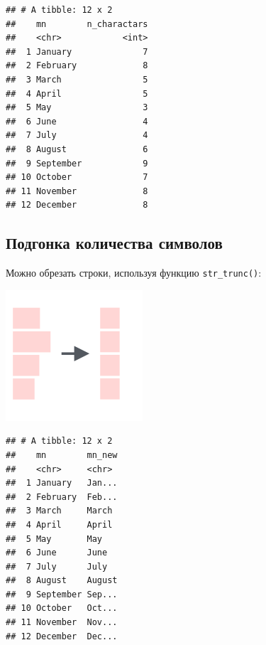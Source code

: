 \documentclass[
]{book}
\newenvironment{Shaded}{\begin{snugshade}}{\end{snugshade}}
\newcommand{\DataTypeTok}[1]{\textcolor[rgb]{0.13,0.29,0.53}{#1}}
\newcommand{\DecValTok}[1]{\textcolor[rgb]{0.00,0.00,0.81}{#1}}
\newcommand{\KeywordTok}[1]{\textcolor[rgb]{0.13,0.29,0.53}{\textbf{#1}}}
\newcommand{\NormalTok}[1]{#1}
\newcommand{\OperatorTok}[1]{\textcolor[rgb]{0.81,0.36,0.00}{\textbf{#1}}}
\newcommand{\StringTok}[1]{\textcolor[rgb]{0.31,0.60,0.02}{#1}}
\begin{document}
\begin{verbatim}
## # A tibble: 12 x 2
##    mn        n_charactars
##    <chr>            <int>
##  1 January              7
##  2 February             8
##  3 March                5
##  4 April                5
##  5 May                  3
##  6 June                 4
##  7 July                 4
##  8 August               6
##  9 September            9
## 10 October              7
## 11 November             8
## 12 December             8
\end{verbatim}

\hypertarget{ux43fux43eux434ux433ux43eux43dux43aux430-ux43aux43eux43bux438ux447ux435ux441ux442ux432ux430-ux441ux438ux43cux432ux43eux43bux43eux432}{%
\subsection{Подгонка количества символов}\label{ux43fux43eux434ux433ux43eux43dux43aux430-ux43aux43eux43bux438ux447ux435ux441ux442ux432ux430-ux441ux438ux43cux432ux43eux43bux43eux432}}

Можно обрезать строки, используя функцию \texttt{str\_trunc()}:

\includegraphics{images/5.02_str_trunc.png}

\begin{Shaded}
\end{Shaded}

\begin{verbatim}
## # A tibble: 12 x 2
##    mn        mn_new
##    <chr>     <chr> 
##  1 January   Jan...
##  2 February  Feb...
##  3 March     March 
##  4 April     April 
##  5 May       May   
##  6 June      June  
##  7 July      July  
##  8 August    August
##  9 September Sep...
## 10 October   Oct...
## 11 November  Nov...
## 12 December  Dec...
\end{verbatim}
\end{document}
